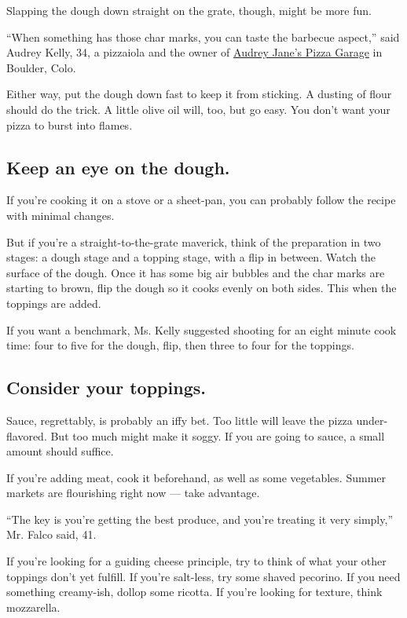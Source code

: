 Slapping the dough down straight on the grate, though, might be more
fun.

``When something has those char marks, you can taste the barbecue
aspect,'' said Audrey Kelly, 34, a pizzaiola and the owner of
\href{https://www.thepizzagarage.com/}{Audrey Jane's Pizza Garage} in
Boulder, Colo.

Either way, put the dough down fast to keep it from sticking. A dusting
of flour should do the trick. A little olive oil will, too, but go easy.
You don't want your pizza to burst into flames.

\hypertarget{keep-an-eye-on-the-dough}{%
\subsection{Keep an eye on the dough.}\label{keep-an-eye-on-the-dough}}

If you're cooking it on a stove or a sheet-pan, you can probably follow
the recipe with minimal changes.

But if you're a straight-to-the-grate maverick, think of the preparation
in two stages: a dough stage and a topping stage, with a flip in
between. Watch the surface of the dough. Once it has some big air
bubbles and the char marks are starting to brown, flip the dough so it
cooks evenly on both sides. This when the toppings are added.

If you want a benchmark, Ms. Kelly suggested shooting for an eight
minute cook time: four to five for the dough, flip, then three to four
for the toppings.

\hypertarget{consider-your-toppings}{%
\subsection{Consider your toppings.}\label{consider-your-toppings}}

Sauce, regrettably, is probably an iffy bet. Too little will leave the
pizza under-flavored. But too much might make it soggy. If you are going
to sauce, a small amount should suffice.

If you're adding meat, cook it beforehand, as well as some vegetables.
Summer markets are flourishing right now --- take advantage.

``The key is you're getting the best produce, and you're treating it
very simply,'' Mr. Falco said, 41.

If you're looking for a guiding cheese principle, try to think of what
your other toppings don't yet fulfill. If you're salt-less, try some
shaved pecorino. If you need something creamy-ish, dollop some ricotta.
If you're looking for texture, think mozzarella.


